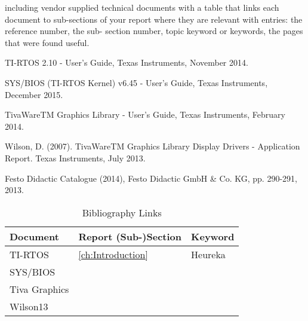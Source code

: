 \begin{thebibliography}{9}

 including vendor supplied technical documents with a table that links each document to sub-sections of your report where they are relevant with entries: the reference number, the sub- section number, topic keyword or keywords, the pages that were found useful.

TI-RTOS 2.10 - User's Guide, Texas Instruments, November 2014.

SYS/BIOS (TI-RTOS Kernel) v6.45 - User's Guide, Texas Instruments, December 2015.

TivaWareTM Graphics Library - User's Guide, Texas Instruments, February 2014.

Wilson, D. (2007). TivaWareTM Graphics Library Display Drivers - Application Report. Texas 
Instruments, July 2013.

Festo Didactic Catalogue (2014), Festo Didactic GmbH \& Co. KG, pp. 290-291, 2013.
 
\end{thebibliography}

\begin{table}[H]
	\begin{tabularx}{\textwidth}{l | l | X}
		Document & Report (Sub-)Section & Keyword \\
		\hline
		TI-RTOS & \ref{ch:Introduction} & Heureka\\
		\hline
		SYS/BIOS & & \\
		\hline
		Tiva Graphics & & \\
		\hline
		Wilson13 & & \\	
	\end{tabularx}
	\caption{Bibliography Links}
	\label{tab:BibliographyLinks}
\end{table}

\vfill